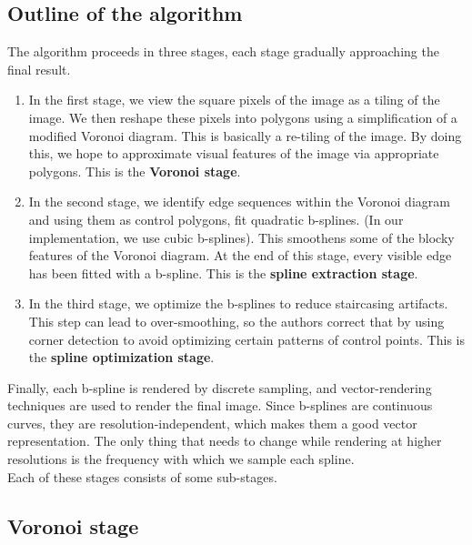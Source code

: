 \documentclass[a4paper,9pt]{article}
\begin{document}
\textcolor{myrust}{\section{Outline of the algorithm}}

The algorithm proceeds in three stages, each stage gradually approaching the final result.\\

\begin{enumerate}

\item In the first stage, we view the square pixels of the image as a tiling of the image. We then reshape these pixels into polygons using a simplification of a modified Voronoi diagram. This is basically a re-tiling of the image. By doing this, we hope to approximate visual features of the image via appropriate polygons. This is the \textbf{Voronoi stage}.

\item In the second stage, we identify edge sequences within the Voronoi diagram and using them as control polygons, fit quadratic b-splines. (In our implementation, we use cubic b-splines). This smoothens some of the blocky features of the Voronoi diagram. At the end of this stage, every visible edge has been fitted with a b-spline. This is the \textbf{spline extraction stage}.

\item In the third stage, we optimize the b-splines to reduce staircasing artifacts. This step can lead to over-smoothing, so the authors correct that by using corner detection to avoid optimizing certain patterns of control points. This is the \textbf{spline optimization stage}.

\end{enumerate}

Finally, each b-spline is rendered by discrete sampling, and vector-rendering techniques are used to render the final image. Since b-splines are continuous curves, they are resolution-independent, which makes them a good vector representation. The only thing that needs to change while rendering at higher resolutions is the frequency with which we sample each spline.\\

Each of these stages consists of some sub-stages.

\textcolor{myrust}{\subsection{Voronoi stage}}
\end{document}
